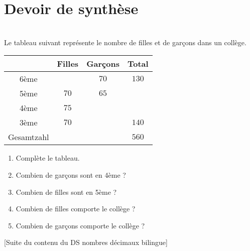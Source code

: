 



\section*{Devoir de synthèse}

\begin{multicols}{2}
\\
Le tableau suivant représente le nombre de filles et de garçons dans un collège.
\begin{center}
\begin{tabular}{|c|c|c|c|}
\cline{2-4}
\multicolumn{1}{l|}{}&Filles&Garçons&Total\\
\hline
6ème&&$70$&$130$\\
\hline
5ème&$70$&$65$&\\ 
\hline
4ème&$75$&&\\
\hline 
3ème&$70$&&$140$\\
\hline
Gesamtzahl&&&$560$\\
\hline
\end{tabular}
\end{center}

\begin{enumerate}
\item Complète le tableau.
\item Combien de garçons sont en 4ème ?
\item Combien de filles sont en 5ème ?
\item Combien de filles comporte le collège ?
\item Combien de garçons comporte le collège ?
\end{enumerate}

\columnbreak

\end{multicols}

[Suite du contenu du DS nombres décimaux bilingue]

